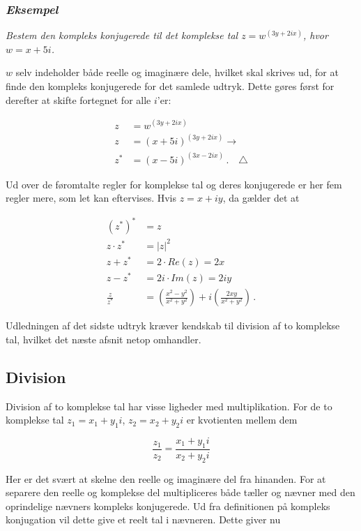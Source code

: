\documentclass[a4paper, 12pt,titlepage]{article}
\begin{document}
\subsubsection*{\emph{Eksempel}}
\label{sec:org979f412}
\emph{Bestem den kompleks konjugerede til det komplekse tal \(z=w^{(3y+2ix)}\), hvor \(w=x+5i\).}

\(w\) selv indeholder både reelle og imaginære dele, hvilket skal skrives ud, for at finde den kompleks konjugerede for det samlede udtryk. Dette gøres først for derefter at skifte fortegnet for alle \(i\)'er:

\begin{align*}
    z &= w^{(3y+2ix)} \\
    z &= (x+5i)^{(3y+2ix)} \to \\
    z^* &= (x-5i)^{(3x-2ix)} \, . \quad \triangle
\end{align*}

Ud over de føromtalte regler for komplekse tal og deres konjugerede er her fem regler mere, som let kan eftervises. Hvis \(z=x+iy\), da gælder det at

\begin{align}
    \left(z^*\right)^* &= z \\
    z\cdot z^* &= |z|^2 \\
    z+ z^* &= 2 \cdot Re(z) = 2 x \\
    z-z^* &= 2i \cdot Im(z) = 2iy \\
    \frac{z}{z^*} &= \left(\frac{x^2-y^2}{x^2+y^2} \right) + i \left(\frac{2 x y}{x^2+y^2}\right) \label{kvotient}\,.
\end{align}

Udledningen af det sidste udtryk kræver kendskab til division af to komplekse tal, hvilket det næste afsnit netop omhandler.

\subsection{Division}
\label{sec:org7e7ebeb}

Division af to komplekse tal har visse ligheder med multiplikation. For de to komplekse tal \(z_1= x_1+y_1 i\), \(z_2=x_2+y_2 i\) er kvotienten mellem dem

\begin{equation}
    \frac{z_1}{z_2} = \frac{x_1+y_1 i}{x_2+y_2 i}
\end{equation}

Her er det svært at skelne den reelle og imaginære del fra hinanden. For at separere den reelle og komplekse del multipliceres både tæller og nævner med den oprindelige nævners kompleks konjugerede. Ud fra definitionen på kompleks konjugation vil dette give et reelt tal i nævneren. Dette giver nu
\end{document}
